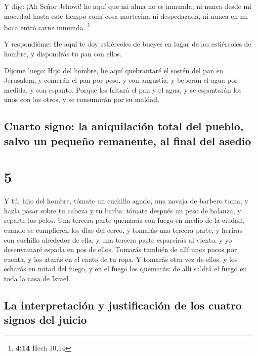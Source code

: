  Y dije: ¡Ah Señor Jehová! he aquí que mi alma no es
inmunda, ni nunca desde mi mocedad hasta este tiempo comí cosa mortecina
ni despedazada, ni nunca en mi boca entró carne inmunda. \footnote{\textbf{4:14}
  Hech 10,14}

 Y respondióme: He aquí te doy estiércoles de bueyes en
lugar de los estiércoles de hombre, y dispondrás tu pan con ellos.

 Díjome luego: Hijo del hombre, he aquí quebrantaré el
sostén del pan en Jerusalem, y comerán el pan por peso, y con angustia;
y beberán el agua por medida, y con espanto.  Porque les
faltará el pan y el agua, y se espantarán los unos con los otros, y se
consumirán por su maldad.

\hypertarget{cuarto-signo-la-aniquilaciuxf3n-total-del-pueblo-salvo-un-pequeuxf1o-remanente-al-final-del-asedio}{%
\subsection{Cuarto signo: la aniquilación total del pueblo, salvo un
pequeño remanente, al final del
asedio}\label{cuarto-signo-la-aniquilaciuxf3n-total-del-pueblo-salvo-un-pequeuxf1o-remanente-al-final-del-asedio}}

\hypertarget{section-4}{%
\section{5}\label{section-4}}

 Y tú, hijo del hombre, tómate un cuchillo agudo, una navaja
de barbero toma, y hazla pasar sobre tu cabeza y tu barba: tómate
después un peso de balanza, y reparte los pelos.  Una
tercera parte quemarás con fuego en medio de la ciudad, cuando se
cumplieren los días del cerco, y tomarás una tercera parte, y herirás
con cuchillo alrededor de ella; y una tercera parte esparcirás al
viento, y yo desenvainaré espada en pos de ellos.  Tomarás
también de allí unos pocos por cuenta, y los atarás en el canto de tu
ropa.  Y tomarás otra vez de ellos, y los echarás en mitad
del fuego, y en el fuego los quemarás: de allí saldrá el fuego en toda
la casa de Israel.

\hypertarget{la-interpretaciuxf3n-y-justificaciuxf3n-de-los-cuatro-signos-del-juicio}{%
\subsection{La interpretación y justificación de los cuatro signos del
juicio}\label{la-interpretaciuxf3n-y-justificaciuxf3n-de-los-cuatro-signos-del-juicio}}

